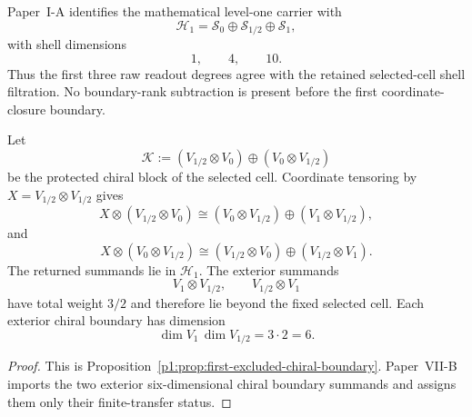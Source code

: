 \documentclass[12pt,a4paper]{article}
\begin{document}
\begin{remark}
\label{p11:rem:first-three-terms-selected}
Paper~I-A identifies the mathematical level-one carrier with
\[
        \mathcal H_1
        =
        \mathcal S_0\oplus\mathcal S_{1/2}\oplus\mathcal S_1,
\]
with shell dimensions
\[
        1,
        \qquad
        4,
        \qquad
        10.
\]
Thus the first three raw readout degrees agree with the retained selected-cell shell filtration.  No boundary-rank subtraction is present before the first coordinate-closure boundary.
\end{remark}

\begin{lemma}
\label{p11:lem:first-forbidden-coordinate-exclusion-boundary}
Let
\[
        \mathcal K
        :=
        (V_{1/2}\otimes V_0)
        \oplus
        (V_0\otimes V_{1/2})
\]
be the protected chiral block of the selected cell.  Coordinate tensoring by \(X=V_{1/2}\otimes V_{1/2}\) gives
\[
        X\otimes (V_{1/2}\otimes V_0)
        \cong
        (V_0\otimes V_{1/2})
        \oplus
        (V_1\otimes V_{1/2}),
\]
and
\[
        X\otimes (V_0\otimes V_{1/2})
        \cong
        (V_{1/2}\otimes V_0)
        \oplus
        (V_{1/2}\otimes V_1).
\]
The returned summands lie in \(\mathcal H_1\).  The exterior summands
\[
        V_1\otimes V_{1/2},
        \qquad
        V_{1/2}\otimes V_1
\]
have total weight \(3/2\) and therefore lie beyond the fixed selected cell.  Each exterior chiral boundary has dimension
\[
        \dim V_1\,\dim V_{1/2}=3\cdot2=6.
\]
\end{lemma}

\begin{proof}
This is Proposition~\ref{p1:prop:first-excluded-chiral-boundary}.  Paper~VII-B
imports the two exterior six-dimensional chiral boundary summands and assigns
them only their finite-transfer status.
\end{proof}
\end{document}
